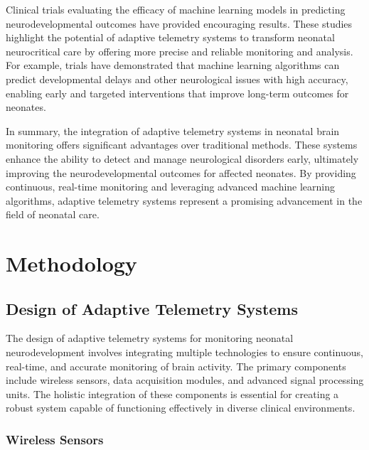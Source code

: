 \documentclass[12pt,journal,compsoc]{IEEEtran}
\begin{document}
Clinical trials evaluating the efficacy of machine learning models in predicting neurodevelopmental outcomes have provided encouraging results. These studies highlight the potential of adaptive telemetry systems to transform neonatal neurocritical care by offering more precise and reliable monitoring and analysis. For example, trials have demonstrated that machine learning algorithms can predict developmental delays and other neurological issues with high accuracy, enabling early and targeted interventions that improve long-term outcomes for neonates.

In summary, the integration of adaptive telemetry systems in neonatal brain monitoring offers significant advantages over traditional methods. These systems enhance the ability to detect and manage neurological disorders early, ultimately improving the neurodevelopmental outcomes for affected neonates. By providing continuous, real-time monitoring and leveraging advanced machine learning algorithms, adaptive telemetry systems represent a promising advancement in the field of neonatal care.

\section{Methodology}

\subsection{Design of Adaptive Telemetry Systems}

The design of adaptive telemetry systems for monitoring neonatal neurodevelopment involves integrating multiple technologies to ensure continuous, real-time, and accurate monitoring of brain activity. The primary components include wireless sensors, data acquisition modules, and advanced signal processing units. The holistic integration of these components is essential for creating a robust system capable of functioning effectively in diverse clinical environments.

\subsubsection{Wireless Sensors}
\end{document}
